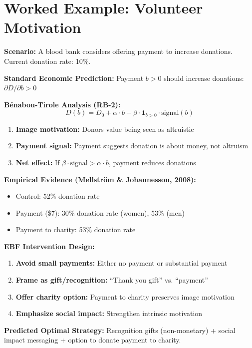 \section{Worked Example: Volunteer Motivation}
\label{sec:rb-example}

\begin{tcolorbox}[colback=yellow!5!white,colframe=yellow!75!black,title=Worked Example: Blood Donation Campaign]
\textbf{Scenario:} A blood bank considers offering payment to increase donations. Current donation rate: 10\%.

\textbf{Standard Economic Prediction:}
Payment $b > 0$ should increase donations: $\partial D / \partial b > 0$

\textbf{Bénabou-Tirole Analysis (RB-2):}
\begin{equation}
D(b) = D_0 + \alpha \cdot b - \beta \cdot \mathbf{1}_{b > 0} \cdot \text{signal}(b)
\end{equation}

\begin{enumerate}
    \item \textbf{Image motivation:} Donors value being seen as altruistic
    \item \textbf{Payment signal:} Payment suggests donation is about money, not altruism
    \item \textbf{Net effect:} If $\beta \cdot \text{signal} > \alpha \cdot b$, payment reduces donations
\end{enumerate}

\textbf{Empirical Evidence (Mellström \& Johannesson, 2008):}
\begin{itemize}
    \item Control: 52\% donation rate
    \item Payment (\$7): 30\% donation rate (women), 53\% (men)
    \item Payment to charity: 53\% donation rate
\end{itemize}

\textbf{EBF Intervention Design:}
\begin{enumerate}
    \item \textbf{Avoid small payments:} Either no payment or substantial payment
    \item \textbf{Frame as gift/recognition:} ``Thank you gift'' vs. ``payment''
    \item \textbf{Offer charity option:} Payment to charity preserves image motivation
    \item \textbf{Emphasize social impact:} Strengthen intrinsic motivation
\end{enumerate}

\textbf{Predicted Optimal Strategy:} Recognition gifts (non-monetary) + social impact messaging + option to donate payment to charity.
\end{tcolorbox}

